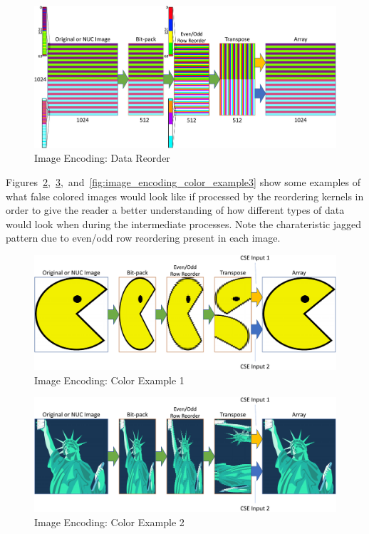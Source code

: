     \begin{figure}
        \centering
        \includegraphics[width=1.0\textwidth]{fig/image_encoding_reorder.pdf}
        \caption{Image Encoding: Data Reorder}
        \label{fig:image_encoding_bitpack_reorder}
    \end{figure}

    Figures~\ref{fig:image_encoding_color_example1},~\ref{fig:image_encoding_color_example2},~and~\ref{fig:image_encoding_color_example3} show some examples of what false colored images would look like if processed by the reordering kernels in order to give the reader a better understanding of how different types of data would look when during the intermediate processes. Note the charateristic jagged pattern due to even/odd row reordering present in each image.

    \begin{figure}
        \centering
        \includegraphics[width=1.0\textwidth]{fig/image_encoding_pac.pdf}
        \caption{Image Encoding: Color Example 1}
        \label{fig:image_encoding_color_example1}
    \end{figure}

    \begin{figure}
        \centering
        \includegraphics[width=1.0\textwidth]{fig/image_encoding_liberty.pdf}
        \caption{Image Encoding: Color Example 2}
        \label{fig:image_encoding_color_example2}
    \end{figure}

